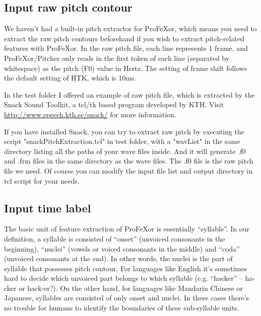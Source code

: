 \documentclass[12pt]{article}
\begin{document}
\subsection{Input raw pitch contour}

We haven't had a built-in pitch extractor for ProFeXor, which means you need to extract the raw pitch contours beforehand if you wish to extract pitch-related features with ProFeXor. In the raw pitch file, each line represents 1 frame, and ProFeXor/Pitcher only reads in the first token of each line (separated by whitespace) as the pitch (F0) value in Hertz. The setting of frame shift follows the default setting of HTK, which is 10ms.

In the test folder I offered an example of raw pitch file, which is extracted by the Snack Sound Toolkit, a tcl/tk based program developed by KTH. Visit \url{http://www.speech.kth.se/snack/} for more information.

If you have installed Snack, you can try to extract raw pitch by executing the script "snackPitchExtraction.tcl" in test folder, with a "wavList" in the same directory listing all the paths of your wave files inside. And it will generate .f0 and .frm files in the same directory as the wave files. The .f0 file is the raw pitch file we need. Of course you can modify the input file list and output directory in tcl script for your needs.

\subsection{Input time label}
\label{sec:timelabel}

The basic unit of feature extraction of ProFeXor is essentially ``syllable''. In our definition, a syllable is consisted of ``onset'' (unvoiced consonants in the beginning), ``nuclei'' (vowels or voiced consonants in the middle) and ``coda'' (unvoiced consonants at the end). In other words, the nuclei is the part of syllable that possesses pitch contour. For languages like English it's sometimes hard to decide which unvoiced part belongs to which syllable (e.g. ``hacker'' -- ha-cker or hack-er?). On the other hand, for languages like Mandarin Chinese or Japanese, syllables are consisted of only onset and nuclei. In these cases there's no trouble for humans to identify the boundaries of these sub-syllable units.
\end{document}

